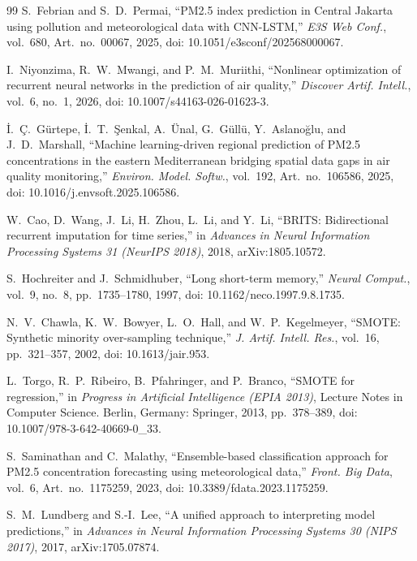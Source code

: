 \documentclass{ieeeaccess}
\begin{document}
\begin{thebibliography}{99}
S.~Febrian and S.~D.~Permai, ``PM2.5 index prediction in Central Jakarta using pollution and meteorological data with CNN-LSTM,'' \emph{E3S Web Conf.}, vol.~680, Art.~no.~00067, 2025, doi: 10.1051/e3sconf/202568000067.

I.~Niyonzima, R.~W.~Mwangi, and P.~M.~Muriithi, ``Nonlinear optimization of recurrent neural networks in the prediction of air quality,'' \emph{Discover Artif. Intell.}, vol.~6, no.~1, 2026, doi: 10.1007/s44163-026-01623-3.

\.{I}.~\c{C}.~G\"urtepe, \.{I}.~T.~\c{S}enkal, A.~\"Unal, G.~G\"ull\"u, Y.~Aslano\u{g}lu, and J.~D.~Marshall, ``Machine learning-driven regional prediction of PM2.5 concentrations in the eastern Mediterranean bridging spatial data gaps in air quality monitoring,'' \emph{Environ. Model. Softw.}, vol.~192, Art.~no.~106586, 2025, doi: 10.1016/j.envsoft.2025.106586.

W.~Cao, D.~Wang, J.~Li, H.~Zhou, L.~Li, and Y.~Li, ``BRITS: Bidirectional recurrent imputation for time series,'' in \emph{Advances in Neural Information Processing Systems 31 (NeurIPS 2018)}, 2018, arXiv:1805.10572.

S.~Hochreiter and J.~Schmidhuber, ``Long short-term memory,'' \emph{Neural Comput.}, vol.~9, no.~8, pp.~1735--1780, 1997, doi: 10.1162/neco.1997.9.8.1735.

N.~V.~Chawla, K.~W.~Bowyer, L.~O.~Hall, and W.~P.~Kegelmeyer, ``SMOTE: Synthetic minority over-sampling technique,'' \emph{J. Artif. Intell. Res.}, vol.~16, pp.~321--357, 2002, doi: 10.1613/jair.953.

L.~Torgo, R.~P.~Ribeiro, B.~Pfahringer, and P.~Branco, ``SMOTE for regression,'' in \emph{Progress in Artificial Intelligence (EPIA 2013)}, Lecture Notes in Computer Science. Berlin, Germany: Springer, 2013, pp.~378--389, doi: 10.1007/978-3-642-40669-0\_33.

S.~Saminathan and C.~Malathy, ``Ensemble-based classification approach for PM2.5 concentration forecasting using meteorological data,'' \emph{Front. Big Data}, vol.~6, Art.~no.~1175259, 2023, doi: 10.3389/fdata.2023.1175259.

S.~M.~Lundberg and S.-I.~Lee, ``A unified approach to interpreting model predictions,'' in \emph{Advances in Neural Information Processing Systems 30 (NIPS 2017)}, 2017, arXiv:1705.07874.


\end{thebibliography}
\end{document}
